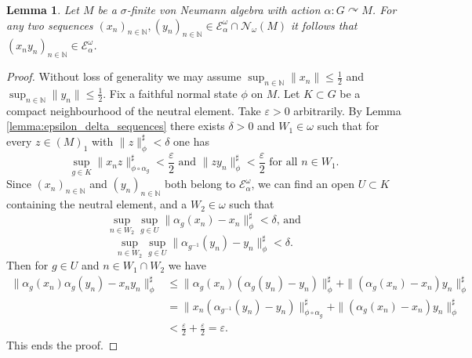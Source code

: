 \documentclass[11pt,a4paper]{article}
\newtheorem{lemma}[theorem]{Lemma}
\theoremstyle{definition}
\theoremstyle{remark}
\numberwithin{equation}{section}
\numberwithin{theorem}{section}
\newcommand{\N}{\mathbb{N}}
\newcommand{\acts}{\curvearrowright}
\newcommand{\e}{\varepsilon}
\begin{document}
\begin{lemma}
Let $M$ be a $\sigma$-finite von Neumann algebra with action $\alpha:G \acts M$.
For any two sequences $(x_n)_{n \in \N}, (y_n)_{n \in \N} \in  \mathcal{E}_\alpha^\omega \cap \mathcal{N}_\omega(M)$ it follows that $(x_ny_n)_{n\in \N} \in \mathcal{E}_\alpha^\omega$. 
\end{lemma}
\begin{proof}
Without loss of generality we may assume $\sup_{n \in \N} \|x_n\| \leq \frac{1}{2}$ and $\sup_{n \in \N} \|y_n\| \leq \frac{1}{2}$.
Fix a faithful normal state $\phi$ on $M$. Let $K \subset G$ be a compact neighbourhood of the neutral element.
Take $\e >0$ arbitrarily.
By Lemma \ref{lemma:epsilon_delta_sequences} there exists $\delta>0$ and $W_1 \in \omega$ such that for every $z \in (M)_1$ with $\|z\|_\phi^\sharp < \delta$ one has 
\[
\sup_{g \in K}\|x_n z\|_{\phi \circ \alpha_g}^\sharp< \frac{\e}{2} \text{ and } \|zy_n\|_\phi^\sharp < \frac{\e}{2} \text{ for all } n \in W_1.
\] 
%
Since $(x_n)_{n\in \N}$ and $(y_n)_{n\in \N}$ both belong to $\mathcal{E}_\alpha^\omega$, we can find an open $U \subset K$ containing the neutral element, and a $W_2 \in \omega$ such that
\[
\sup_{n \in W_2}\sup_{ g \in U}\|\alpha_g(x_n) - x_n\|_\phi^\sharp < \delta \text{, and}
\]
%
\[\sup_{n \in W_2}\sup_{ g \in U}
\|\alpha_{g^{-1}}(y_n) - y_n\|_\phi^\sharp < \delta.
\]
%
Then for $g \in U$ and $n \in W_1 \cap W_2$ we have
\begin{align*}
\|\alpha_g(x_n) \alpha_g(y_n) - x_ny_n\|_\phi^\sharp &\leq \|\alpha_g(x_n)(\alpha_g(y_n) - y_n)\|_\phi^\sharp + \|(\alpha_g(x_n) - x_n)y_n\|_\phi^\sharp\\
&= \|x_n(\alpha_{g^{-1}}(y_n) - y_n)\|_{\phi \circ \alpha_g}^\sharp + \|(\alpha_g(x_n) - x_n)y_n\|_\phi^\sharp\\
& < \frac{\e}{2} + \frac{\e}{2} = \e.
\end{align*}
This ends the proof.
\end{proof}
\end{document}
